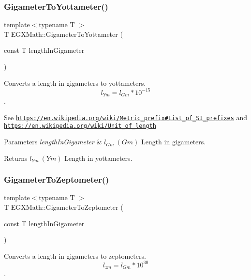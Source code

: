 \subsubsection{\texorpdfstring{Gigameter\+To\+Yottameter()}{GigameterToYottameter()}}
{\footnotesize\ttfamily template$<$typename T $>$ \\
T E\+G\+X\+Math\+::\+Gigameter\+To\+Yottameter (\begin{DoxyParamCaption}\item[{const T}]{length\+In\+Gigameter }\end{DoxyParamCaption})}



Converts a length in gigameters to yottameters. \[ l_{Ym}=l_{Gm} * 10^{-15} \]. 

See \href{https://en.wikipedia.org/wiki/Metric_prefix#List_of_SI_prefixes}{\tt https\+://en.\+wikipedia.\+org/wiki/\+Metric\+\_\+prefix\#\+List\+\_\+of\+\_\+\+S\+I\+\_\+prefixes} and \href{https://en.wikipedia.org/wiki/Unit_of_length}{\tt https\+://en.\+wikipedia.\+org/wiki/\+Unit\+\_\+of\+\_\+length} 
\begin{DoxyParams}{Parameters}
{\em length\+In\+Gigameter} & $ l_{Gm}\ (Gm)$ Length in gigameters. \\
\hline
\end{DoxyParams}
\begin{DoxyReturn}{Returns}
$ l_{Ym}\ (Ym)$ Length in yottameters. 
\end{DoxyReturn}
\mbox{\label{group___e_g_x_math-_conversions-_length_conversions-_gigameter-_s_i_ga5013069156df55018bc5a7f57f236f08}} 
\subsubsection{\texorpdfstring{Gigameter\+To\+Zeptometer()}{GigameterToZeptometer()}}
{\footnotesize\ttfamily template$<$typename T $>$ \\
T E\+G\+X\+Math\+::\+Gigameter\+To\+Zeptometer (\begin{DoxyParamCaption}\item[{const T}]{length\+In\+Gigameter }\end{DoxyParamCaption})}



Converts a length in gigameters to zeptometers. \[ l_{zm}=l_{Gm} * 10^{30} \]. 

